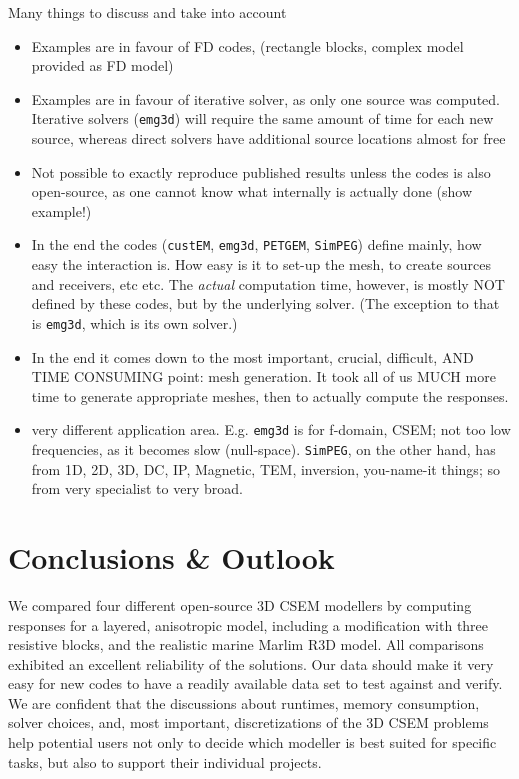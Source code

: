 \documentclass[
    paper,
  ]{geophysics}
\newcommand{\emg}[2]{\texttt{emg#1#2}\xspace}
\newcommand{\simpeg}{\texttt{SimPEG}\xspace}
\newcommand{\custem}{\texttt{custEM}\xspace}
\newcommand{\petgem}{\texttt{PETGEM}\xspace}
\begin{document}
Many things to discuss and take into account
\begin{itemize}
    \item Examples are in favour of FD codes, (rectangle blocks, complex model provided as FD model)
    \item Examples are in favour of iterative solver, as only one source was computed. Iterative solvers (\emg3d) will require the same amount of time for each new source, whereas direct solvers have additional source locations almost for free
    \item Not possible to exactly reproduce published results unless the codes is also open-source, as one cannot know what internally is actually done (show example!)
    \item In the end the codes (\custem, \emg3d, \petgem, \simpeg) define mainly, how easy the interaction is. How easy is it to set-up the mesh, to create sources and receivers, etc etc. The \emph{actual} computation time, however,
    is mostly NOT defined by these codes, but by the underlying solver. (The exception to that is \emg3d, which is its own solver.)
    \item In the end it comes down to the most important, crucial, difficult, AND TIME CONSUMING point: mesh generation. It took all of us MUCH more time to generate appropriate meshes, then to actually compute the responses.
    \item very different application area. E.g. \emg3d is for f-domain, CSEM; not too low frequencies, as it becomes slow (null-space). \simpeg, on the other hand, has from 1D, 2D, 3D, DC, IP, Magnetic, TEM, inversion, you-name-it things; so from very specialist to very broad.
\end{itemize}

\section{Conclusions \& Outlook}
%
%
%
%

We compared four different open-source 3D CSEM modellers by computing responses for a layered, anisotropic model, including a modification with three resistive blocks, and the realistic marine Marlim R3D model. All comparisons exhibited an excellent reliability of the solutions. Our data should make it very easy for new codes to have a readily available data set to test against and verify. We are confident that the discussions about runtimes, memory consumption, solver choices, and, most important, discretizations of the 3D CSEM problems help potential users not only to decide which modeller is best suited for specific tasks, but also to support their individual projects.
\end{document}

